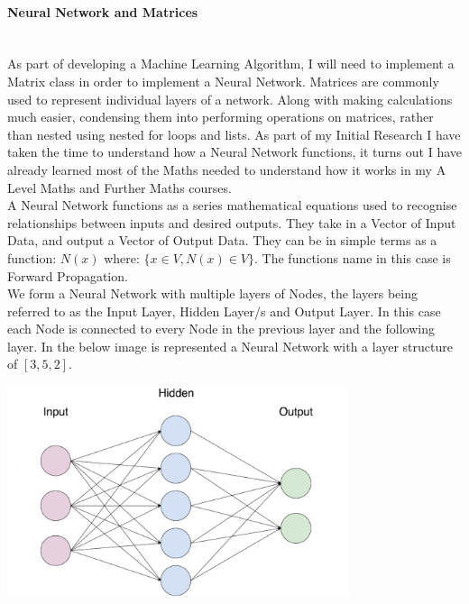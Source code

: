 \begin{flushleft}
                    \paragraph{Neural Network and Matrices} \mbox{} \\
                        As part of developing a Machine Learning Algorithm, I will need to implement a Matrix class in order to
                        implement a Neural Network. Matrices are commonly used to represent individual layers of a network. Along
                        with making calculations much easier, condensing them into performing operations on matrices, rather than
                        nested using nested for loops and lists. As part of my Initial Research I have taken the time to understand
                        how a Neural Network functions, it turns out I have already learned most of the Maths needed to understand
                        how it works in my A Level Maths and Further Maths courses. \\
                        \vspace{0.2cm}
                        A Neural Network functions as a series mathematical equations used to recognise relationships between inputs
                        and desired outputs. They take in a Vector of Input Data, and output a Vector of Output Data. They can be
                        in simple terms as a function: $N(x)$ where: $\{x \in V, N(x) \in V\}$. The functions name in this case is
                        Forward Propagation. \\
                        \vspace{0.2cm}
                        We form a Neural Network with multiple layers of Nodes, the layers being referred to as the Input Layer, 
                        Hidden Layer/s and Output Layer. In this case each Node is connected to every Node in the previous layer and
                        the following layer. In the below image is represented a Neural Network with a layer structure of $[3, 5, 2]$.

                        \vspace{0.1cm}
                        \centerline{\includegraphics[width=10cm]{Images/InitialResearch/NeuralNetworkExample.png}}


\end{flushleft}
